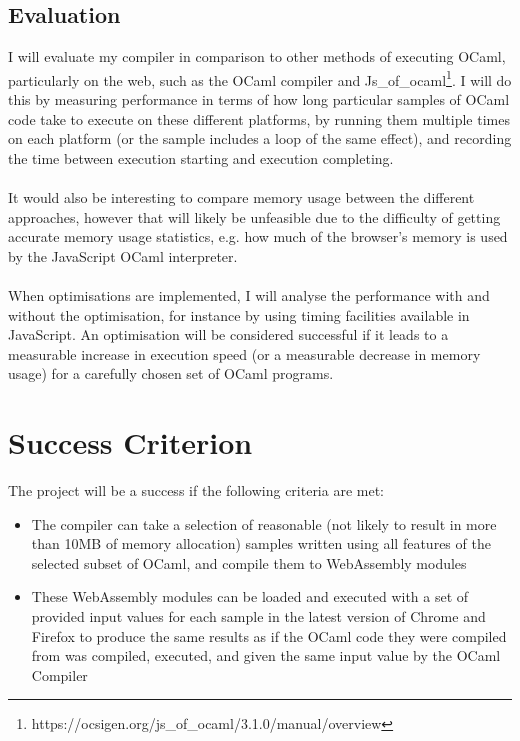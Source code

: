 	\subsection*{Evaluation}
	I will evaluate my compiler in comparison to other methods of executing OCaml, particularly on the web, such as the OCaml compiler and Js\_of\_ocaml\footnote{https://ocsigen.org/js\_of\_ocaml/3.1.0/manual/overview}. I will do this by measuring performance in terms of how long particular samples of OCaml code take to execute on these different platforms, by running them multiple times on each platform (or the sample includes a loop of the same effect), and recording the time between execution starting and execution completing.
	\\\\
	It would also be interesting to compare memory usage between the different approaches, however that will likely be unfeasible due to the difficulty of getting accurate memory usage statistics, e.g. how much of the browser's memory is used by the JavaScript OCaml interpreter.
	\\\\
	When optimisations are implemented, I will analyse the performance with and without the optimisation, for instance by using timing facilities available in JavaScript. An optimisation will be considered successful if it leads to a measurable increase in execution speed (or a measurable decrease in memory usage) for a carefully chosen set of OCaml programs.
	
	
	\section*{Success Criterion}
	The project will be a success if the following criteria are met:
	\begin{itemize}
		\item The compiler can take a selection of reasonable (not likely to result in more than 10MB of memory allocation) samples written using all features of the selected subset of OCaml, and compile them to WebAssembly modules
		\item These WebAssembly modules can be loaded and executed with a set of provided input values for each sample in the latest version of Chrome and Firefox to produce the same results as if the OCaml code they were compiled from was compiled, executed, and given the same input value by the OCaml Compiler
	\end{itemize}
	
	
